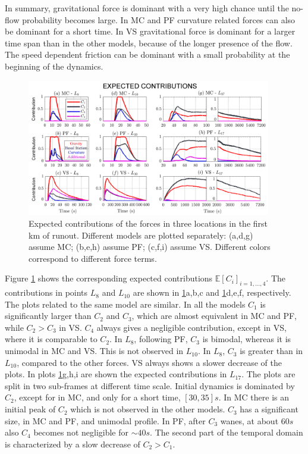 \documentclass{article}
\begin{document}
In summary, gravitational force is dominant with a very high chance until the no-flow probability becomes large. In MC and PF curvature related forces can also be dominant for a short time. In VS gravitational force is dominant for a larger time span than in the other models, because of the longer presence of the flow. The speed dependent friction can be dominant with a small probability at the beginning of the dynamics.
\begin{figure}[H]
         \centering
        \includegraphics[width=0.95\textwidth]{figures/Colima/Ci1_total.png}
        \caption{Expected contributions of the forces in three locations in the first km of runout. Different models are plotted separately: (a,d,g) assume MC; (b,e,h) assume PF; (c,f,i) assume VS. Different colors correspond to different force terms.}
        \label{fig:Colima-Ci_1}
\end{figure}
Figure \ref{fig:Colima-Ci_1} shows the corresponding expected contributions $\mathbb E[C_i]_{i=1,\dots,4}$. The contributions in points $L_8$ and $L_{10}$ are shown in \ref{fig:Colima-Ci_1}a,b,c and \ref{fig:Colima-Ci_1}d,e,f, respectively. The plots related to the same model are similar. In all the models $C_1$ is significantly larger than $C_2$ and $C_3$, which are almost equivalent in MC and PF, while $C_2>C_3$ in VS. $C_4$ always gives a negligible contribution, except in VS, where it is comparable to $C_2$. In $L_8$, following PF, $C_3$ is bimodal, whereas it is unimodal in MC and VS. This is not observed in $L_{10}$. In $L_8$, $C_3$ is greater than in $L_{10}$, compared to the other forces. VS always shows a slower decrease of the plots. In plots \ref{fig:Colima-Ci_1}g,h,i are shown the expected contributions in $L_{17}$. The plots are split in two sub-frames at different time scale. Initial dynamics is dominated by $C_2$, except for in MC, and only for a short time, $[30, 35] s$. In MC there is an initial peak of $C_2$ which is not observed in the other models. $C_3$ has a significant size, in MC and PF, and unimodal profile. In PF, after $C_3$ wanes, at about $60 s$ also $C_4$ becomes not negligible for $\sim 40 s$. The second part of the temporal domain is characterized by a slow decrease of $C_2>C_1$.
\end{document}
